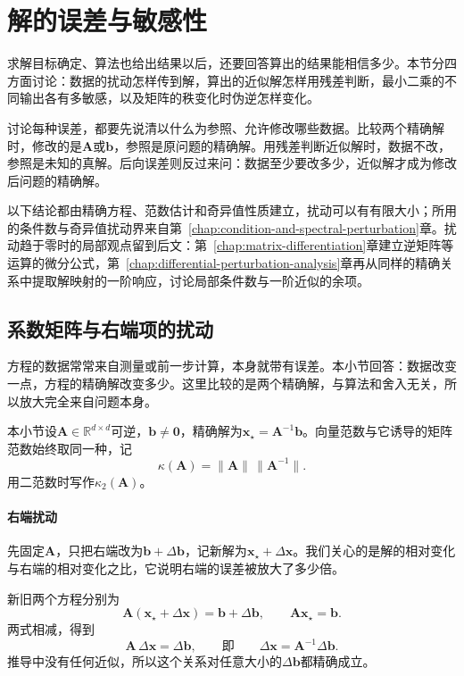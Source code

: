 \section{解的误差与敏感性}
\label{sec:ls-numerical-sensitivity}

求解目标确定、算法也给出结果以后，还要回答算出的结果能相信多少。本节分四方面讨论：数据的扰动怎样传到解，算出的近似解怎样用残差判断，最小二乘的不同输出各有多敏感，以及矩阵的秩变化时伪逆怎样变化。

讨论每种误差，都要先说清以什么为参照、允许修改哪些数据。比较两个精确解时，修改的是$\bm A$或$\bm b$，参照是原问题的精确解。用残差判断近似解时，数据不改，参照是未知的真解。后向误差则反过来问：数据至少要改多少，近似解才成为修改后问题的精确解。

以下结论都由精确方程、范数估计和奇异值性质建立，扰动可以有有限大小；所用的条件数与奇异值扰动界来自第~\ref{chap:condition-and-spectral-perturbation}章。扰动趋于零时的局部观点留到后文：第~\ref{chap:matrix-differentiation}章建立逆矩阵等运算的微分公式，第~\ref{chap:differential-perturbation-analysis}章再从同样的精确关系中提取解映射的一阶响应，讨论局部条件数与一阶近似的余项。

\subsection{系数矩阵与右端项的扰动}
\label{sec:ls-equation-sensitivity}

方程的数据常常来自测量或前一步计算，本身就带有误差。本小节回答：数据改变一点，方程的精确解改变多少。这里比较的是两个精确解，与算法和舍入无关，所以放大完全来自问题本身。

本小节设$\bm A\in\mathbb R^{d\times d}$可逆，$\bm b\ne\bm0$，精确解为$\bm x_\star=\bm A^{-1}\bm b$。向量范数与它诱导的矩阵范数始终取同一种，记
\[
 \kappa(\bm A)=\lVert\bm A\rVert\,\lVert\bm A^{-1}\rVert .
\]
用二范数时写作$\kappa_2(\bm A)$。

\paragraph{右端扰动}
先固定$\bm A$，只把右端改为$\bm b+\Delta\bm b$，记新解为$\bm x_\star+\Delta\bm x$。我们关心的是解的相对变化与右端的相对变化之比，它说明右端的误差被放大了多少倍。

新旧两个方程分别为
\[
 \bm A(\bm x_\star+\Delta\bm x)=\bm b+\Delta\bm b,\qquad \bm A\bm x_\star=\bm b .
\]
两式相减，得到
\begin{equation}
 \bm A\,\Delta\bm x=\Delta\bm b,\qquad\text{即}\qquad \Delta\bm x=\bm A^{-1}\Delta\bm b .
 \label{eq:ls-rhs-perturbation-exact}
\end{equation}
推导中没有任何近似，所以这个关系对任意大小的$\Delta\bm b$都精确成立。

